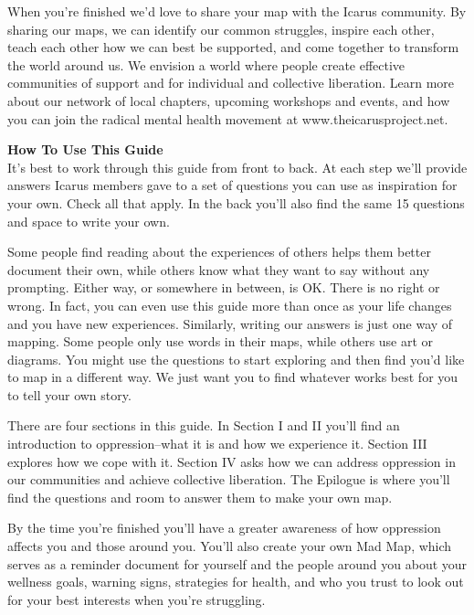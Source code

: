 When  you’re  finished  we’d  love  to  share  your  map  with  the  Icarus  community. By sharing our maps, we can identify our common struggles, inspire each other, teach each other how we can best be supported, and come together to transform the world around us. We envision a world where people create effective  communities  of  support  and  for  individual  and  collective  liberation.  Learn more  about  our  network  of  local  chapters,  upcoming  workshops  and  events, and  how  you  can  join  the  radical  mental  health  movement  at  www.theicarusproject.net.


\noindent\textcolor{ProcessBlue}{\textbf{\LARGE{How To Use This Guide}}}\\

It’s best to work through this guide from front to  back. At each step we’ll provide answers Icarus members gave to a set of questions you can use as inspiration for your own. Check all that apply. In the back you’ll also find the same 15 questions and space to write your own.

Some  people  find  reading  about  the  experiences  of  others  helps  them  better document  their  own,  while  others  know  what  they  want  to  say  without  any prompting.  Either  way,  or  somewhere  in  between,  is  OK.  There  is  no  right  or wrong. In fact, you can even use this guide more than once as your life changes and you have new experiences. Similarly, writing our answers is just one way of mapping. Some people only use words in their maps, while others use art or diagrams.  You  might  use  the  questions  to  start  exploring  and  then  find  you’d like to map in a different way. We just want you to find whatever works best for you to tell your own story.

There are four sections in this guide. In Section I and II  you’ll find an introduction to oppression--what it is and how we experience it. Section III explores how we  cope  with  it.  Section  IV  asks  how  we  can  address  oppression  in  our  communities and achieve collective liberation. The Epilogue is where you’ll find the questions and room to answer them to make your own map.

By the time you’re finished you’ll have a greater awareness of how oppression affects  you and those around you. You’ll also create your own Mad Map, which serves as a reminder document for yourself and the people around you about your wellness goals, warning signs, strategies for health, and who you trust to look out for your best interests when you’re struggling.

